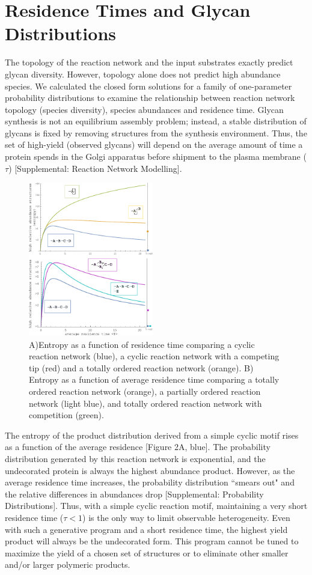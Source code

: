 \documentclass[twocolumn]{article}
\begin{document}
\section*{Residence Times and Glycan Distributions}
The topology of the reaction network and the input substrates exactly predict glycan diversity. However, topology alone does not predict high abundance species. We calculated the closed form solutions for a family of one-parameter probability distributions to examine the relationship between reaction network topology (species diversity), species abundances and residence time. Glycan synthesis is not an equilibrium assembly problem; instead, a stable distribution of glycans is fixed by removing structures from the synthesis environment. Thus, the set of high-yield (observed glycans) will depend on the average amount of time a protein spends in the Golgi apparatus before shipment to the plasma membrane ($\tau$) [Supplemental: Reaction Network Modelling].


\begin{figure}[h]
    \includegraphics[width=0.485\textwidth]{Figure_3.pdf}
	\caption{A)Entropy as a function of residence time comparing a cyclic reaction network (blue), a cyclic reaction network with a competing tip (red) and a totally ordered reaction network (orange). B) Entropy as a function of average residence time comparing a totally ordered reaction network (orange), a partially ordered reaction network (light blue), and totally ordered reaction network with competition (green).}
\end{figure}

The entropy of the product distribution derived from a simple cyclic motif rises as a function of the average residence [Figure 2A, blue]. The probability distribution generated by this reaction network is exponential, and the undecorated protein is always the highest abundance product. However, as the average residence time increases, the probability distribution ``smears out" and the relative differences in abundances drop [Supplemental: Probability Distributions]. Thus, with a simple cyclic reaction motif, maintaining a very short residence time ($\tau <1 $) is the only way to limit observable heterogeneity. Even with such a generative program and a short residence time, the highest yield product will always be the undecorated form. This program cannot be tuned to maximize the yield of a chosen set of structures or to eliminate other smaller and/or larger polymeric products. 
\end{document}
